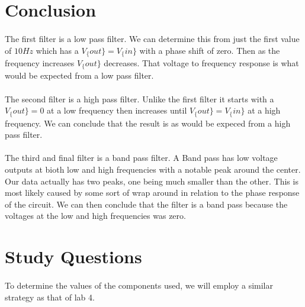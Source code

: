 \documentclass{article}
\begin{document}
\section*{Conclusion}
\paragraph{}
The first filter is a low pass filter. We can determine this from just the first value of $10Hz$ which has a 
$V_\{out\} = V_\{in\}$ with a phase shift of zero. Then as the frequency increases $V_\{out\}$ decreases. That
voltage to frequency response is what would be expected from a low pass filter.
\paragraph{}
The second filter is a high pass filter. Unlike the first filter it starts with a $V_\{out\} = 0$ at a low frequency
 then increases until $V_\{out\} = V_\{in\}$ at a high frequency. We can conclude that the result is as would be 
 expeced from a high pass filter.
 \paragraph{}
 The third and final filter is a band pass filter. A Band pass has low voltage outputs at bioth low and high frequencies 
 with a notable peak around the center. Our data actually has two peaks, one being much smaller than the other. This 
 is most likely caused by some sort of wrap around in relation to the phase response of the circuit. We can then conclude
 that the filter is a band pass because the voltages at the low and high frequencies was zero.


\section*{Study Questions}
\paragraph{}
To determine the values of the components used, we will employ a similar strategy as that of lab 4. 
\end{document}
